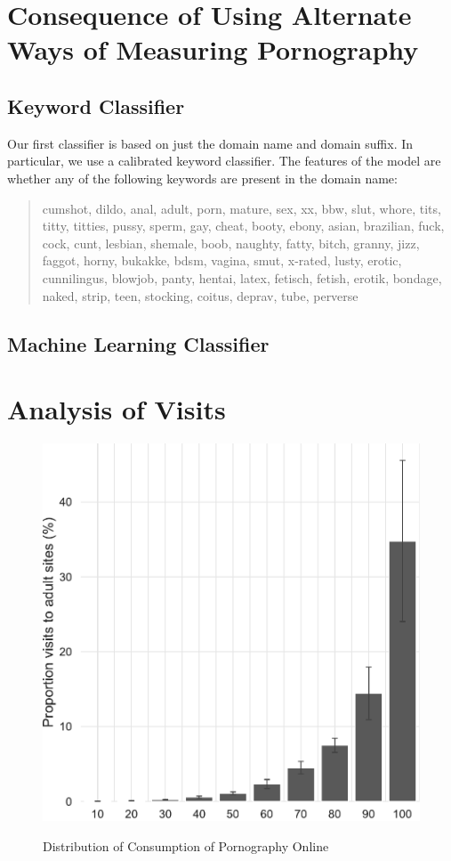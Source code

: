 \documentclass[12pt, letterpaper]{article}
\begin{document}
\section{Consequence of Using Alternate Ways of Measuring Pornography}
\subsection{Keyword Classifier}
Our first classifier is based on just the domain name and domain suffix. In particular, we use a calibrated keyword classifier. The features of the model are whether any of the following keywords are present in the domain name:

\begin{quote}

cumshot, dildo, anal, adult, porn, mature, sex, xx, bbw, slut, whore, tits, titty, titties, pussy, sperm, gay, cheat, booty, ebony, asian, brazilian, fuck, cock, cunt, lesbian, shemale, boob, naughty, fatty, bitch, granny, jizz, faggot, horny, bukakke, bdsm, vagina, smut, x-rated, lusty, erotic, cunnilingus, blowjob, panty, hentai, latex, fetisch, fetish, erotik, bondage, naked, strip, teen, stocking, coitus, deprav, tube, perverse 

\end{quote}
\subsection{Machine Learning Classifier}

\section{Analysis of Visits}

\begin{figure}[h]
\centering
\caption{Distribution of Consumption of Pornography Online}
\includegraphics[scale=.75]{../figs/distribution_proportion_adultsites_visits.pdf}
\label{fig:distribution_visits}
\end{figure}
\end{document}
